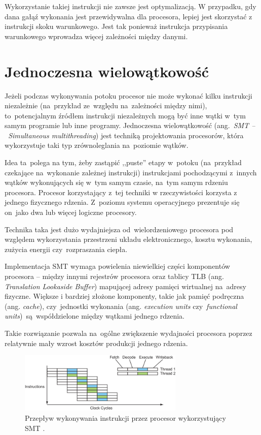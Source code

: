 Wykorzystanie takiej instrukcji nie zawsze jest optymalizacją. W przypadku, gdy dana gałąź wykonania jest przewidywalna dla procesora, lepiej jest skorzystać z instrukcji skoku warunkowego. Jest tak ponieważ instrukcja przypisania warunkowego wprowadza więcej zależności między danymi.

\section{Jednoczesna wielowątkowość}

Jeżeli podczas wykonywania potoku procesor nie może wykonać kilku instrukcji niezależnie (na~przykład ze~względu na~zależności między nimi), to~potencjalnym źródłem instrukcji niezależnych mogą być inne wątki w~tym samym programie lub inne programy. Jednoczesna wielowątkowość (ang.~\textit{SMT --~Simultaneous multithreading}) jest techniką projektowania procesorów, która wykorzystuje taki typ zrównoleglania na~poziomie wątków.

Idea ta~polega na tym, żeby zastąpić ,,puste'' etapy w~potoku (na~przykład czekające na~wykonanie zależnej instrukcji) instrukcjami pochodzącymi z~innych wątków wykonujących się w~tym samym czasie, na~tym samym rdzeniu procesora. Procesor korzystający z~tej techniki w rzeczywistości korzysta z jednego fizycznego rdzenia. Z~poziomu systemu operacyjnego prezentuje się on~jako dwa lub więcej logiczne procesory.

Technika taka jest dużo wydajniejsza od~wielordzeniowego procesora pod względem wykorzystania przestrzeni układu elektronicznego, kosztu wykonania, zużycia energii czy~rozpraszania ciepła.

Implementacja SMT wymaga powielenia niewielkiej części komponentów procesora -- między innymi rejestrów procesora oraz tablicy TLB (ang. \textit{Translation Lookaside Buffer}) mapującej adresy pamięci wirtualnej na~adresy fizyczne. Większe i bardziej złożone komponenty, takie jak pamięć podręczna (ang. \textit{cache}), czy~jednostki wykonania (ang. \textit{execution units} czy~\textit{functional units})~są~współdzielone między wątkami jednego rdzenia.

Takie rozwiązanie pozwala na~ogólne zwiększenie wydajności procesora poprzez relatywnie mały wzrost kosztów produkcji jednego rdzenia.


\begin{figure}[!h]
	\centering
	\includegraphics[width=0.7\textwidth]{images/smt2}
	\caption{Przepływ wykonywania instrukcji przez procesor wykorzystujący SMT \cite{ModernMicroprocessors90MinGuide}.}
\end{figure}

